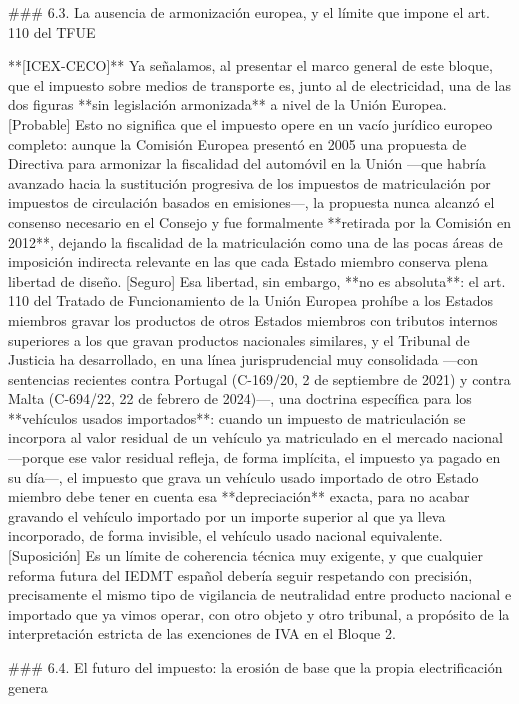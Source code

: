 \documentclass[10pt,a4paper]{article}
\begin{document}
### 6.3. La ausencia de armonización europea, y el límite que impone el art. 110 del TFUE

**[ICEX-CECO]** Ya señalamos, al presentar el marco general de este bloque, que el impuesto sobre medios de transporte es, junto al de electricidad, una de las dos figuras **sin legislación armonizada** a nivel de la Unión Europea. [Probable] Esto no significa que el impuesto opere en un vacío jurídico europeo completo: aunque la Comisión Europea presentó en 2005 una propuesta de Directiva para armonizar la fiscalidad del automóvil en la Unión —que habría avanzado hacia la sustitución progresiva de los impuestos de matriculación por impuestos de circulación basados en emisiones—, la propuesta nunca alcanzó el consenso necesario en el Consejo y fue formalmente **retirada por la Comisión en 2012**, dejando la fiscalidad de la matriculación como una de las pocas áreas de imposición indirecta relevante en las que cada Estado miembro conserva plena libertad de diseño. [Seguro] Esa libertad, sin embargo, **no es absoluta**: el art. 110 del Tratado de Funcionamiento de la Unión Europea prohíbe a los Estados miembros gravar los productos de otros Estados miembros con tributos internos superiores a los que gravan productos nacionales similares, y el Tribunal de Justicia ha desarrollado, en una línea jurisprudencial muy consolidada —con sentencias recientes contra Portugal (C-169/20, 2 de septiembre de 2021) y contra Malta (C-694/22, 22 de febrero de 2024)—, una doctrina específica para los **vehículos usados importados**: cuando un impuesto de matriculación se incorpora al valor residual de un vehículo ya matriculado en el mercado nacional —porque ese valor residual refleja, de forma implícita, el impuesto ya pagado en su día—, el impuesto que grava un vehículo usado importado de otro Estado miembro debe tener en cuenta esa **depreciación** exacta, para no acabar gravando el vehículo importado por un importe superior al que ya lleva incorporado, de forma invisible, el vehículo usado nacional equivalente. [Suposición] Es un límite de coherencia técnica muy exigente, y que cualquier reforma futura del IEDMT español debería seguir respetando con precisión, precisamente el mismo tipo de vigilancia de neutralidad entre producto nacional e importado que ya vimos operar, con otro objeto y otro tribunal, a propósito de la interpretación estricta de las exenciones de IVA en el Bloque 2.

### 6.4. El futuro del impuesto: la erosión de base que la propia electrificación genera
\end{document}
